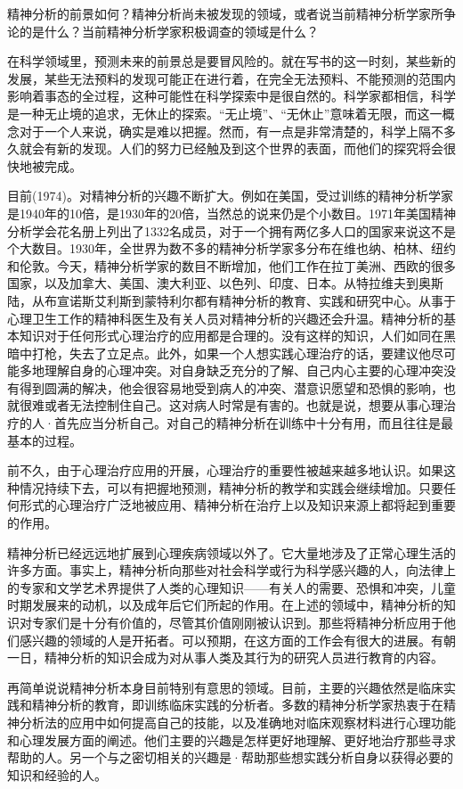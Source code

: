 \documentclass[UTF8,10pt,a4paper,openany]{book}
\begin{document}
精神分析的前景如何？精神分析尚未被发现的领域，或者说当前精神分析学家所争论的是什么？当前精神分析学家积极调查的领域是什么？

在科学领域里，预测未来的前景总是要冒风险的。就在写书的这一时刻，某些新的发展，某些无法预料的发现可能正在进行着，在完全无法预料、不能预测的范围内影响着事态的全过程，这种可能性在科学探索中是很自然的。科学家都相信，科学是一种无止境的追求，无休止的探索。“无止境”、“无休止”意味着无限，而这一概念对于一个人来说，确实是难以把握。然而，有一点是非常清楚的，科学上隔不多久就会有新的发现。人们的努力已经触及到这个世界的表面，而他们的探究将会很快地被完成。

目前(1974)。对精神分析的兴趣不断扩大。例如在美国，受过训练的精神分析学家是1940年的10倍，是1930年的20倍，当然总的说来仍是个小数目。1971年美国精神分析学会花名册上列出了1332名成员，对于一个拥有两亿多人口的国家来说这不是个大数目。1930年，全世界为数不多的精神分析学家多分布在维也纳、柏林、纽约和伦敦。今天，精神分析学家的数目不断增加，他们工作在拉丁美洲、西欧的很多国家，以及加拿大、美国、澳大利亚、以色列、印度、日本。从特拉维夫到奥斯陆，从布宣诺斯艾利斯到蒙特利尔都有精神分析的教育、实践和研究中心。从事于心理卫生工作的精神科医生及有关人员对精神分析的兴趣还会升温。精神分析的基本知识对于任何形式心理治疗的应用都是合理的。没有这样的知识，人们如同在黑暗中打枪，失去了立足点。此外，如果一个人想实践心理治疗的话，要建议他尽可能多地理解自身的心理冲突。对自身缺乏充分的了解、自己内心主要的心理冲突没有得到圆满的解决，他会很容易地受到病人的冲突、潜意识愿望和恐惧的影响，也就很难或者无法控制住自己。这对病人时常是有害的。也就是说，想要从事心理治疗的人·首先应当分析自己。对自己的精神分析在训练中十分有用，而且往往是最基本的过程。

前不久，由于心理治疗应用的开展，心理治疗的重要性被越来越多地认识。如果这种情况持续下去，可以有把握地预测，精神分析的教学和实践会继续增加。只要任何形式的心理治疗广泛地被应用、精神分析在治疗上以及知识来源上都将起到重要的作用。

精神分析已经远远地扩展到心理疾病领域以外了。它大量地涉及了正常心理生活的许多方面。事实上，精神分析向那些对社会科学或行为科学感兴趣的人，向法律上的专家和文学艺术界提供了人类的心理知识——有关人的需要、恐惧和冲突，儿童时期发展来的动机，以及成年后它们所起的作用。在上述的领域中，精神分析的知识对专家们是十分有价值的，尽管其价值刚刚被认识到。那些将精神分析应用于他们感兴趣的领域的人是开拓者。可以预期，在这方面的工作会有很大的进展。有朝一日，精神分析的知识会成为对从事人类及其行为的研究人员进行教育的内容。

再简单说说精神分析本身目前特别有意思的领域。目前，主要的兴趣依然是临床实践和精神分析的教育，即训练临床实践的分析者。多数的精神分析学家热衷于在精神分析法的应用中如何提高自己的技能，以及准确地对临床观察材料进行心理功能和心理发展方面的阐述。他们主要的兴趣是怎样更好地理解、更好地治疗那些寻求帮助的人。另一个与之密切相关的兴趣是·帮助那些想实践分析自身以获得必要的知识和经验的人。
\end{document}
